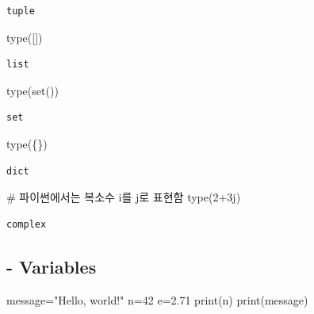 \documentclass[
  letterpaper,
  DIV=11,
  numbers=noendperiod]{scrreprt}
\newenvironment{Shaded}{\begin{snugshade}}{\end{snugshade}}
\newcommand{\BuiltInTok}[1]{\textcolor[rgb]{0.00,0.23,0.31}{#1}}
\newcommand{\CommentTok}[1]{\textcolor[rgb]{0.37,0.37,0.37}{#1}}
\newcommand{\DecValTok}[1]{\textcolor[rgb]{0.68,0.00,0.00}{#1}}
\newcommand{\FloatTok}[1]{\textcolor[rgb]{0.68,0.00,0.00}{#1}}
\newcommand{\NormalTok}[1]{\textcolor[rgb]{0.00,0.23,0.31}{#1}}
\newcommand{\OperatorTok}[1]{\textcolor[rgb]{0.37,0.37,0.37}{#1}}
\newcommand{\OtherTok}[1]{\textcolor[rgb]{0.00,0.23,0.31}{#1}}
\newcommand{\StringTok}[1]{\textcolor[rgb]{0.13,0.47,0.30}{#1}}
\begin{document}
\begin{verbatim}
tuple
\end{verbatim}

\begin{Shaded}
\begin{Highlighting}[]
\BuiltInTok{type}\NormalTok{([])}
\end{Highlighting}
\end{Shaded}

\begin{verbatim}
list
\end{verbatim}

\begin{Shaded}
\begin{Highlighting}[]
\BuiltInTok{type}\NormalTok{(}\BuiltInTok{set}\NormalTok{())}
\end{Highlighting}
\end{Shaded}

\begin{verbatim}
set
\end{verbatim}

\begin{Shaded}
\begin{Highlighting}[]
\BuiltInTok{type}\NormalTok{(\{\})}
\end{Highlighting}
\end{Shaded}

\begin{verbatim}
dict
\end{verbatim}

\begin{Shaded}
\begin{Highlighting}[]
\CommentTok{\# 파이썬에서는 복소수 i를 j로 표현함}
\BuiltInTok{type}\NormalTok{(}\DecValTok{2}\OperatorTok{+}\OtherTok{3j}\NormalTok{)}
\end{Highlighting}
\end{Shaded}

\begin{verbatim}
complex
\end{verbatim}

\subsection{- Variables}\label{variables}

\begin{Shaded}
\begin{Highlighting}[]
\NormalTok{message}\OperatorTok{=}\StringTok{"Hello, world!"}
\NormalTok{n}\OperatorTok{=}\DecValTok{42}
\NormalTok{e}\OperatorTok{=}\FloatTok{2.71}
\BuiltInTok{print}\NormalTok{(n)}
\BuiltInTok{print}\NormalTok{(message)}
\end{Highlighting}
\end{Shaded}
\end{document}
